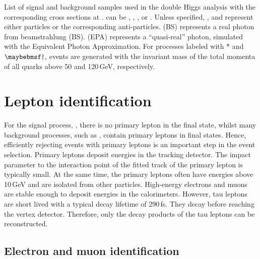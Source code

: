 \begin{table}[!htbp]
\caption[Signal and background samples with the corresponding cross sections at .]
{List of signal and background samples used in the double Higgs analysis with the corresponding cross sections at . \Pquark can be \Pup, \Pdown, \Pstrange, \Pbottom or \Ptop. Unless specified, \Pquark, \Plepton and \Pnu represent either particles or the corresponding anti-particles. \Pphoton(BS) represents a real photon from beamstrahlung (BS). \Pphoton(EPA) represents a ``quasi-real'' photon, simulated with the Equivalent Photon Approximation. For processes labeled with * and $\myDagger$, events are generated with the invariant mass of the total momenta of all quarks above 50 and 120\,GeV, respectively.}
\label{tab:doubleHiggsMCSamples}
\end{table}

\section{Lepton identification}
\label{sec:doubleHiggsLepton}

For the signal process, \eeToHHbbWWHad, there is no primary lepton in the final state, whilst many background  processes, such as \HepProcess{\Pquark \Pquark \Pquark \Pquark \Plepton \Pnu}, contain primary leptons in final states. Hence, efficiently rejecting events with primary leptons is an important step in the event selection. Primary leptons deposit energies in the tracking detector. The impact parameter to the interaction point of the fitted track of the primary lepton is typically small. At the same time, the primary leptons often have energies above 10\,GeV and are  isolated from other particles. High-energy electrons and muons are stable enough to deposit energies in the calorimeters. However,  tau leptons are short lived with a typical decay lifetime of 290\,fs\cite{Abreu:1991jn}. They decay before reaching the vertex detector. Therefore, only the decay products of the tau leptons can be reconstructed.





\subsection{Electron and muon identification}
\label{sec:doubleHiggsLeptonID}

